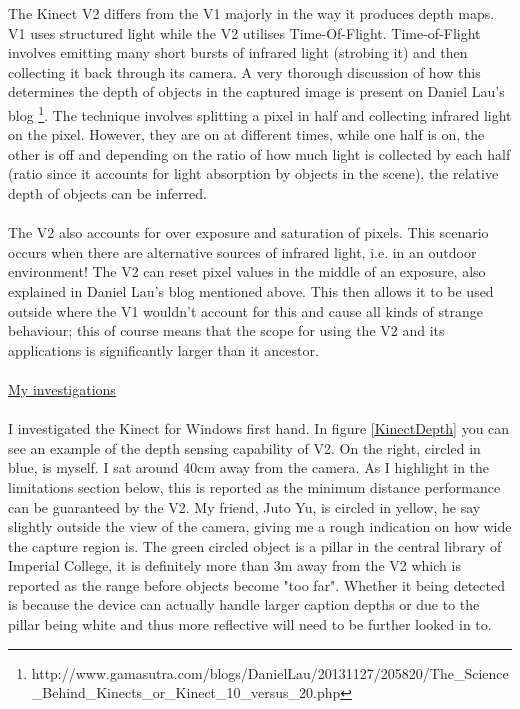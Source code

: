\documentclass[11pt]{report}
\begin{document}
The Kinect V2 differs from the V1 majorly in the way it produces depth maps.
V1 uses structured light while the V2 utilises Time-Of-Flight. Time-of-Flight
involves emitting many short bursts of infrared light (strobing it) and then
collecting it back through its camera. A very thorough discussion of how this
determines the depth of objects in the captured image is present on Daniel
Lau's blog \footnote{http://www.gamasutra.com/blogs/DanielLau/20131127/205820/The\_Science\_Behind\_Kinects\_or\_Kinect\_10\_versus\_20.php}.
The technique involves splitting a pixel in half and collecting infrared light
on the pixel. However, they are on at different times, while one half is on, 
the other is off and depending on the ratio of how much light is collected 
by each half (ratio since it accounts for light absorption by objects in the scene),
the relative depth of objects can be inferred. 
\\ \\
The V2 also accounts for over exposure and saturation of pixels. This scenario
occurs when there are alternative sources of infrared light, i.e. in an outdoor
environment! The V2 can reset pixel values in the middle of an exposure, also
explained in Daniel Lau's blog mentioned above. This then
allows it to be used outside where the V1 wouldn't account for this and cause
all kinds of strange behaviour; this of course means that the scope for using
the V2 and its applications is significantly larger than it ancestor.
\\ \\
\underline{My investigations} \\ \\
I investigated the Kinect for Windows first hand. In figure \ref{KinectDepth} 
you can see an example of the depth sensing capability of V2. On the right,
circled in blue, is myself. I sat around 40cm away from the camera. As I highlight 
in the limitations section below, this is reported as the minimum distance 
performance can be guaranteed by the V2. My friend, Juto Yu, is circled in 
yellow, he say slightly outside the view of the camera, giving me a rough 
indication on how wide the capture region is. The green circled object is a 
pillar in the central library of Imperial College, it is definitely more than 
3m away from the V2 which is reported as the range before objects become 
"too far". Whether it being detected is because the device can actually 
handle larger caption depths or due to the pillar being white and thus 
more reflective will need to be further looked in to.
\end{document}
